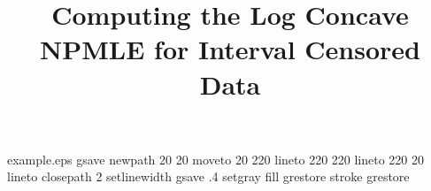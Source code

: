 %
%
%
%
%






\begin{filecontents*}{example.eps}
gsave
newpath
  20 20 moveto
  20 220 lineto
  220 220 lineto
  220 20 lineto
closepath
2 setlinewidth
gsave
  .4 setgray fill
grestore
stroke
grestore
\end{filecontents*}
%
\RequirePackage{fix-cm}
%
\documentclass[twocolumn]{svjour3}          %
%
\smartqed  %
%
\usepackage{graphicx}

\usepackage{amsmath} 
\usepackage{amssymb}

\usepackage{multirow}
\usepackage{float}

\newtheorem{thm}{Theorem}



%
%
%
%
%


\title{Computing the Log Concave NPMLE for Interval Censored Data%
}

